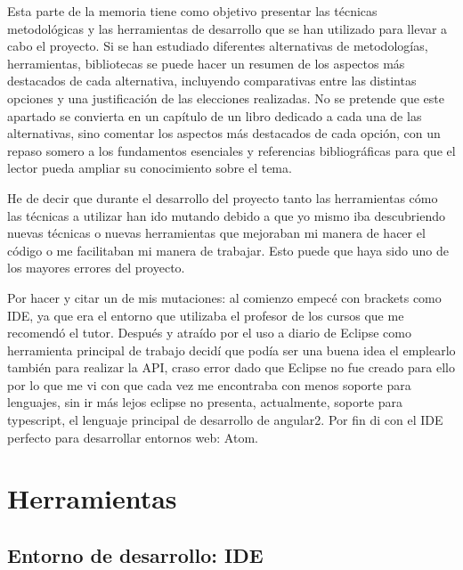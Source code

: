 
Esta parte de la memoria tiene como objetivo presentar las técnicas metodológicas y las herramientas de desarrollo que se han utilizado para llevar a cabo el proyecto. Si se han estudiado diferentes alternativas de metodologías, herramientas, bibliotecas se puede hacer un resumen de los aspectos más destacados de cada alternativa, incluyendo comparativas entre las distintas opciones y una justificación de las elecciones realizadas. 
No se pretende que este apartado se convierta en un capítulo de un libro dedicado a cada una de las alternativas, sino comentar los aspectos más destacados de cada opción, con un repaso somero a los fundamentos esenciales y referencias bibliográficas para que el lector pueda ampliar su conocimiento sobre el tema.

He de decir que durante el desarrollo del proyecto tanto  las herramientas cómo las técnicas a utilizar han ido mutando debido a que yo mismo iba descubriendo nuevas técnicas o nuevas herramientas que mejoraban mi manera de hacer el código o me facilitaban mi manera de trabajar. Esto puede que haya sido uno de los mayores errores del proyecto.

Por hacer y citar un de mis mutaciones: al comienzo empecé con brackets como IDE, ya que era el entorno que utilizaba el profesor de los cursos que me recomendó el tutor. Después y atraído por el uso a diario de Eclipse como herramienta principal de trabajo decidí que podía ser una buena idea el emplearlo también para realizar la API, craso error dado que Eclipse no fue creado para ello por lo que me vi con que cada vez me encontraba con menos soporte para lenguajes, sin ir más lejos eclipse no presenta, actualmente, soporte para typescript, el lenguaje principal de desarrollo de angular2. Por fin di con el IDE perfecto para desarrollar entornos web: Atom.

\section{Herramientas}\label{Herramientas}
\subsection{Entorno de desarrollo: IDE}\label{entorno-desarrollo}
